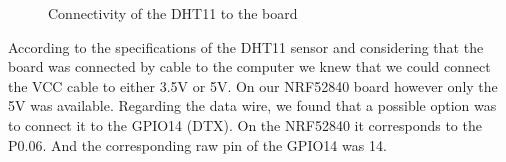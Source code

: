 \begin{figure}[!ht]
    \caption{Connectivity of the DHT11 to the board}%
    \label{fig:example}%
\end{figure}
According to the specifications of the DHT11 sensor and considering that the board was connected by cable to the computer we knew that we could connect the VCC cable to either 3.5V or 5V. On our NRF52840 board however only the 5V was available. 
Regarding the data wire, we found that a possible option was to connect it to the GPIO14 (DTX). On the NRF52840 it corresponds to the P0.06. And the corresponding raw pin of the GPIO14 was 14. 

